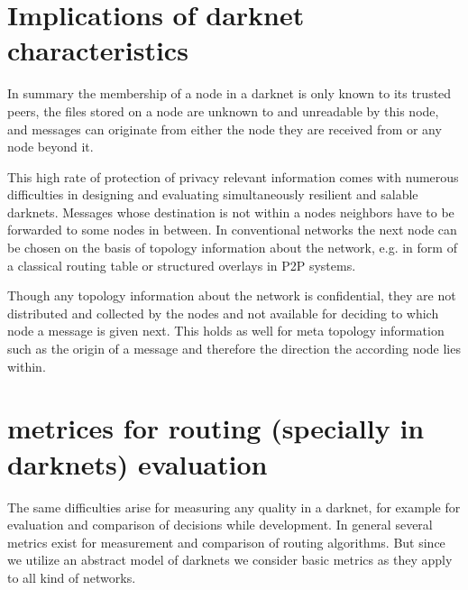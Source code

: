\section{Implications of darknet characteristics}

In summary the membership of a node in a darknet is only known to its trusted peers, the files stored on a node are unknown to and unreadable by this node, and messages can originate from either the node they are received from or any node beyond it.

This high rate of protection of privacy relevant information comes with numerous difficulties in designing and evaluating simultaneously resilient and salable darknets. Messages whose destination is not within a nodes neighbors have to be forwarded to some nodes in between. In conventional networks the next node can be chosen on the basis of topology information about the network, e.g. in form of a classical routing table or structured overlays in P2P systems.

Though any topology information about the network is confidential, they are not distributed and collected by the nodes and not available for deciding to which node a message is given next. This holds as well for meta topology information such as the origin of a message and therefore the direction the according node lies within.

\section{metrices for routing (specially in darknets) evaluation}

The same difficulties arise for measuring any quality in a darknet, for example for evaluation and comparison of decisions while development. In general several metrics exist for measurement and comparison of routing algorithms. But since we utilize an abstract model of darknets we consider basic metrics as they apply to all kind of networks.

